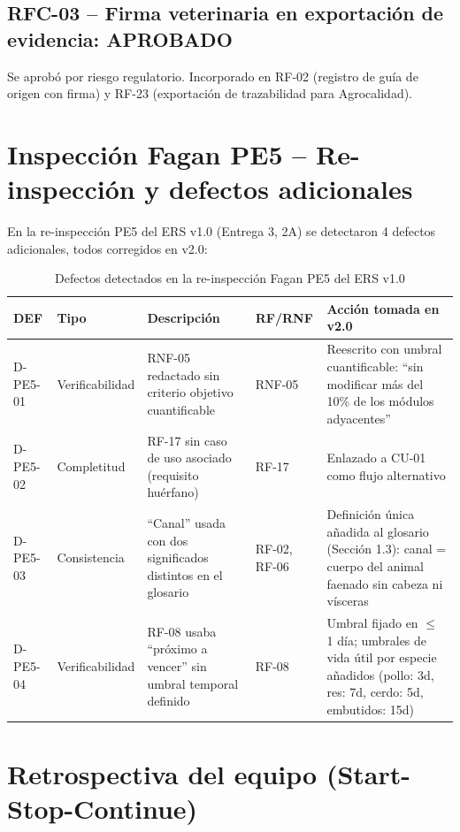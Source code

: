 \documentclass[11pt,a4paper]{article}
\begin{document}
\subsection{RFC-03 -- Firma veterinaria en exportación de evidencia: APROBADO}

Se aprobó por riesgo regulatorio. Incorporado en RF-02 (registro de guía de origen con firma) y RF-23 (exportación de trazabilidad para Agrocalidad).

\section{Inspección Fagan PE5 -- Re-inspección y defectos adicionales}

En la re-inspección PE5 del ERS v1.0 (Entrega 3, 2A) se detectaron 4 defectos adicionales, todos corregidos en v2.0:

\begin{longtable}{|p{1cm}|p{2.5cm}|p{4cm}|p{1.5cm}|p{5cm}|}
\caption{Defectos detectados en la re-inspección Fagan PE5 del ERS v1.0}\\
\hline
\textbf{DEF} & \textbf{Tipo} & \textbf{Descripción} & \textbf{RF/RNF} & \textbf{Acción tomada en v2.0} \\
\hline
D-PE5-01 & Verificabilidad & RNF-05 redactado sin criterio objetivo cuantificable & RNF-05 & Reescrito con umbral cuantificable: ``sin modificar más del 10\% de los módulos adyacentes'' \\
\hline
D-PE5-02 & Completitud & RF-17 sin caso de uso asociado (requisito huérfano) & RF-17 & Enlazado a CU-01 como flujo alternativo \\
\hline
D-PE5-03 & Consistencia & ``Canal'' usada con dos significados distintos en el glosario & RF-02, RF-06 & Definición única añadida al glosario (Sección 1.3): canal = cuerpo del animal faenado sin cabeza ni vísceras \\
\hline
D-PE5-04 & Verificabilidad & RF-08 usaba ``próximo a vencer'' sin umbral temporal definido & RF-08 & Umbral fijado en $\leq$ 1 día; umbrales de vida útil por especie añadidos (pollo: 3d, res: 7d, cerdo: 5d, embutidos: 15d) \\
\hline
\end{longtable}

\section{Retrospectiva del equipo (Start-Stop-Continue)}
\end{document}
